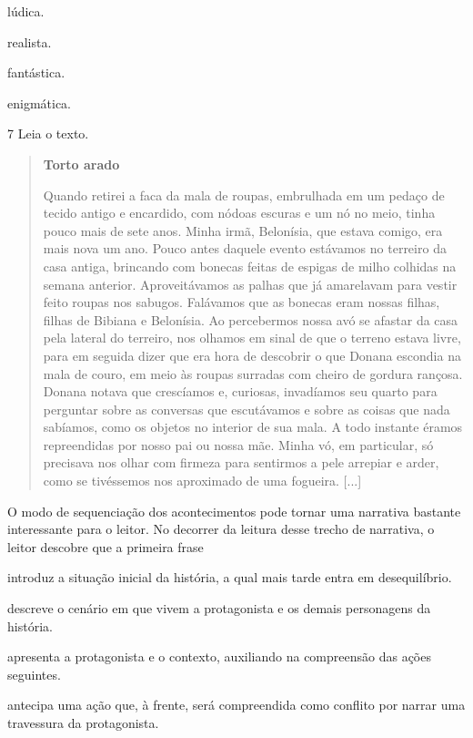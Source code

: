 \begin{escolha}
\item lúdica.

\item realista.

\item fantástica.

\item enigmática.
\end{escolha}

\num{7} Leia o texto.

\begin{quote}
\textbf{Torto arado}

Quando retirei a faca da mala de roupas, embrulhada em um pedaço de
tecido antigo e encardido, com nódoas escuras e um nó no meio, tinha
pouco mais de sete anos. Minha irmã, Belonísia, que estava comigo, era
mais nova um ano. Pouco antes daquele evento estávamos no terreiro da
casa antiga, brincando com bonecas feitas de espigas de milho colhidas
na semana anterior. Aproveitávamos as palhas que já amarelavam para
vestir feito roupas nos sabugos. Falávamos que as bonecas eram nossas
filhas, filhas de Bibiana e Belonísia. Ao percebermos nossa avó se
afastar da casa pela lateral do terreiro, nos olhamos em sinal de que o
terreno estava livre, para em seguida dizer que era hora de descobrir o
que Donana escondia na mala de couro, em meio às roupas surradas com
cheiro de gordura rançosa. Donana notava que crescíamos e, curiosas,
invadíamos seu quarto para perguntar sobre as conversas que escutávamos
e sobre as coisas que nada sabíamos, como os objetos no interior de sua
mala. A todo instante éramos repreendidas por nosso pai ou nossa mãe.
Minha vó, em particular, só precisava nos olhar com firmeza para
sentirmos a pele arrepiar e arder, como se tivéssemos nos aproximado de
uma fogueira. {[}...{]}

\end{quote}

O modo de sequenciação dos acontecimentos pode tornar uma narrativa
bastante interessante para o leitor. No decorrer da leitura desse trecho
de narrativa, o leitor descobre que a primeira frase

\begin{escolha}
\item introduz a situação inicial da história, a qual mais tarde entra em
desequilíbrio.

\item descreve o cenário em que vivem a protagonista e os demais
personagens da história.

\item apresenta a protagonista e o contexto, auxiliando na compreensão das
ações seguintes.

\item antecipa uma ação que, à frente, será compreendida como conflito por
narrar uma travessura da protagonista.
\end{escolha}

